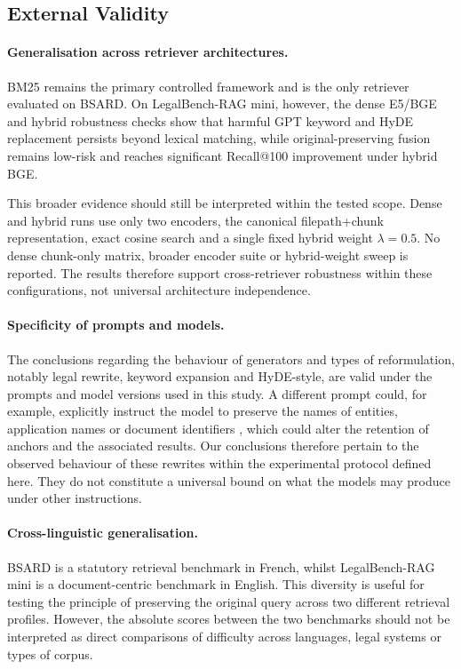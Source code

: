 \documentclass[a4paper,fleqn]{cas-dc}
\begin{document}
\subsection{External Validity}
\paragraph{Generalisation across retriever architectures.}
BM25 remains the primary controlled framework and is the only
retriever evaluated on BSARD. On LegalBench-RAG mini, however,
the dense E5/BGE and hybrid robustness checks show that harmful
GPT keyword and HyDE replacement persists beyond lexical
matching, while original-preserving fusion remains low-risk and
reaches significant Recall@100 improvement under hybrid BGE.

This broader evidence should still be interpreted within the
tested scope. Dense and hybrid runs use only two encoders, the
canonical filepath+chunk representation, exact cosine search and
a single fixed hybrid weight $\lambda=0.5$. No dense chunk-only
matrix, broader encoder suite or hybrid-weight sweep is reported.
The results therefore support cross-retriever robustness within
these configurations, not universal architecture independence.
\paragraph{Specificity of prompts and models.}
The conclusions regarding the behaviour of generators and
types of reformulation, notably legal rewrite,
keyword expansion and HyDE-style, are valid under the
prompts and model versions used in this
study. A different prompt could, for example,
explicitly instruct the model to preserve the names
of entities, application names or document identifiers
, which could alter the retention
of anchors and the associated results.
Our conclusions therefore pertain to the
observed behaviour of these rewrites within the
experimental protocol defined here. They do not constitute a
universal bound on what the models may
produce under other instructions.
\paragraph{Cross-linguistic generalisation.}
BSARD is a statutory retrieval benchmark in
French, whilst LegalBench-RAG mini is a
document-centric benchmark in English. This
diversity is useful for testing the principle of
preserving the original query across two
different retrieval profiles. However, the 
absolute scores between the two benchmarks should not be
interpreted as direct comparisons of
difficulty across languages, legal systems or types
of corpus.
\end{document}
